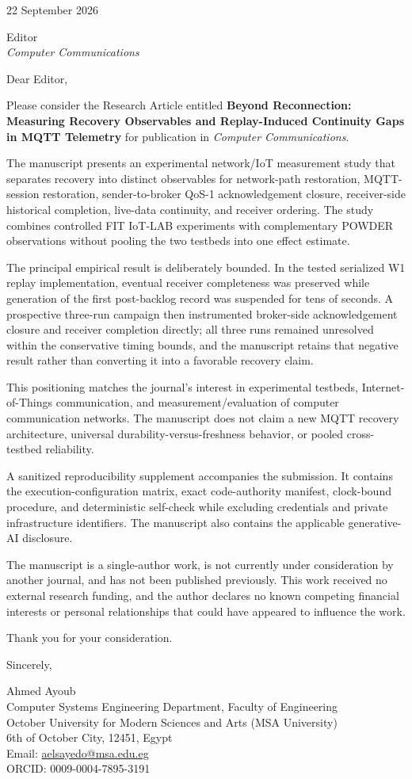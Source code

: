 \documentclass[11pt]{article}
\begin{document}
22 September 2026

Editor\\
\textit{Computer Communications}

Dear Editor,

Please consider the Research Article entitled \textbf{Beyond Reconnection: Measuring Recovery Observables and Replay-Induced Continuity Gaps in MQTT Telemetry} for publication in \textit{Computer Communications}.

The manuscript presents an experimental network/IoT measurement study that separates recovery into distinct observables for network-path restoration, MQTT-session restoration, sender-to-broker QoS-1 acknowledgement closure, receiver-side historical completion, live-data continuity, and receiver ordering. The study combines controlled FIT IoT-LAB experiments with complementary POWDER observations without pooling the two testbeds into one effect estimate.

The principal empirical result is deliberately bounded. In the tested serialized W1 replay implementation, eventual receiver completeness was preserved while generation of the first post-backlog record was suspended for tens of seconds. A prospective three-run campaign then instrumented broker-side acknowledgement closure and receiver completion directly; all three runs remained unresolved within the conservative timing bounds, and the manuscript retains that negative result rather than converting it into a favorable recovery claim.

This positioning matches the journal's interest in experimental testbeds, Internet-of-Things communication, and measurement/evaluation of computer communication networks. The manuscript does not claim a new MQTT recovery architecture, universal durability-versus-freshness behavior, or pooled cross-testbed reliability.

A sanitized reproducibility supplement accompanies the submission. It contains the execution-configuration matrix, exact code-authority manifest, clock-bound procedure, and deterministic self-check while excluding credentials and private infrastructure identifiers. The manuscript also contains the applicable generative-AI disclosure.

The manuscript is a single-author work, is not currently under consideration by another journal, and has not been published previously. This work received no external research funding, and the author declares no known competing financial interests or personal relationships that could have appeared to influence the work.

Thank you for your consideration.

Sincerely,

Ahmed Ayoub\\
Computer Systems Engineering Department, Faculty of Engineering\\
October University for Modern Sciences and Arts (MSA University)\\
6th of October City, 12451, Egypt\\
Email: \href{mailto:aelsayedo@msa.edu.eg}{aelsayedo@msa.edu.eg}\\
ORCID: 0009-0004-7895-3191
\end{document}
